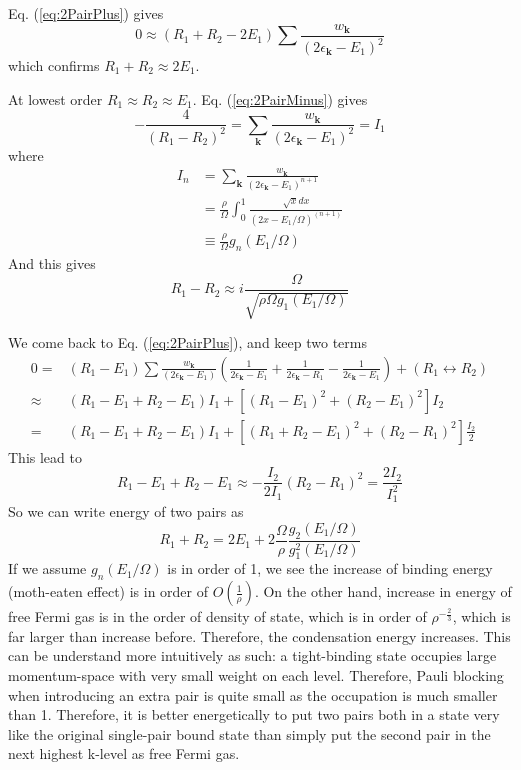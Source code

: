 \documentclass{article}
\newcommand{\vk}{\ensuremath{\mathbf{k}}}
\begin{document}
Eq. (\ref{eq:2PairPlus}) gives 
\begin{equation*}
0\approx(R_1+R_2-2E_1)\sum\frac{w_\vk}{(2\epsilon_\vk-E_1)^2}
\label{eq:}
\end{equation*}
which confirms  $R_1+R_2\approx2E_1$.

At lowest order $R_1\approx{}R_2\approx{}E_1$.  Eq. (\ref{eq:2PairMinus}) gives 
\begin{equation}
-\frac{4}{(R_1-R_2)^2}=\sum_{\vk}\frac{w_\vk}{(2\epsilon_\vk-E_1)^2}=I_1
\label{eq:}
\end{equation}
where 
\begin{equation}
\begin{split}
I_n&=\sum_{\vk}\frac{w_\vk}{(2\epsilon_\vk-E_1)^{n+1}}\\
	&=\frac{\rho}{\Omega}\int^1_0\frac{\sqrt{x}dx}{(2x-E_1/\Omega)^{(n+1)}}\\
	&\equiv\frac{\rho}{\Omega}g_n(E_1/\Omega)
\end{split}
\label{eq:}
\end{equation}
And this gives 
\begin{equation}
R_1-R_2\approx{}i\frac{\Omega}{\sqrt{\rho\Omega{}g_1(E_1/\Omega)}}
\label{eq:}
\end{equation}

We come back to Eq. (\ref{eq:2PairPlus}), and keep two terms
\begin{equation}
\begin{split}
0=&(R_1-E_1)\sum{\frac{w_\vk}{(2\epsilon_\vk-E_1)}}\left(\frac{1}{2\epsilon_\vk-E_1}+\frac{1}{2\epsilon_\vk-R_1}-\frac{1}{2\epsilon_\vk-E_1}\right)+(R_1\leftrightarrow{}R_2)\\
\approx&(R_1-E_1+R_2-E_1)I_1+\left[(R_1-E_1)^2+(R_2-E_1)^2\right]I_2\\
=&(R_1-E_1+R_2-E_1)I_1+\left[(R_1+R_2-E_1)^2+(R_2-R_1)^2\right]\frac{I_2}{2}
\end{split}
\label{eq:}
\end{equation}
This lead to 
\begin{equation}
R_1-E_1+R_2-E_1\approx-\frac{I_2}{2I_1}(R_2-R_1)^2=\frac{2I_2}{I_1^2}
\label{eq:}
\end{equation}
So we can write energy of two pairs as
\begin{equation}
R_1+R_2=2E_1+2\frac{\Omega}{\rho}\frac{g_2(E_1/\Omega)}{g_1^2(E_1/\Omega)}
\label{eq:}
\end{equation}
If we assume $g_n(E_1/\Omega)$ is in order of 1, we see the increase of binding energy (moth-eaten effect) is in order of $O(\frac{1}{\rho})$.  On the other hand, increase in energy of free Fermi gas is in the order of density of state, which is in order of $\rho^{-\frac{2}{3}}$, which is far larger than increase before.  Therefore, the condensation energy increases. This can be understand more intuitively as such: a tight-binding state occupies large momentum-space with very small weight on each level. Therefore, Pauli blocking when introducing an extra pair is quite small as the occupation is much smaller than 1. Therefore, it is better energetically to put two pairs both in a state very like the original single-pair bound state than simply put the second pair in the next highest k-level as free Fermi gas.   
\end{document}
